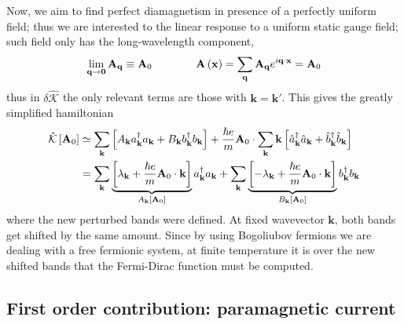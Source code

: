 Now, we aim to find perfect diamagnetism in presence of a perfectly uniform field; thus we are interested to the linear response to a uniform static gauge field; such field only has the long-wavelength component,
\[
	\lim_{\mathbf{q}\to\mathbf{0}} \mathbf{A}_\mathbf{q} \equiv \mathbf{A}_0
	\qquad\qquad
	\mathbf{A}\left({\mathbf{x}}\right) = \sum_\mathbf{q} \mathbf{A}_\mathbf{q} e^{i\mathbf{q}\cdot\mathbf{x}} = \mathbf{A}_0
\]
thus in $\delta \hat{\mathcal{K}}$ the only relevant terms are those with $\mathbf{k} = \mathbf{k}'$. This gives the greatly simplified hamiltonian
\begin{equation}\label{eq:first order perturbed paramagnetic hamiltonian}
\begin{aligned}
	\hat{\mathcal{K}} \left[{\mathbf{A}_0}\right] &\simeq \sum_\mathbf{k} \left[{A_\mathbf{k} a_\mathbf{k}^\dagger a_\mathbf{k} + B_\mathbf{k} b_\mathbf{k}^\dagger b_\mathbf{k}}\right] + \frac{\hbar e}{m} \mathbf{A}_0 \cdot \sum_\mathbf{k} \mathbf{k} \left[{\hat{a}_\mathbf{k}^\dagger \hat{a}_\mathbf{k} + \hat{b}_\mathbf{k}^\dagger \hat{b}_\mathbf{k} }\right] \\
	&= \sum_\mathbf{k} 
		\underbrace{\left[{\lambda_\mathbf{k} + \frac{\hbar e}{m} \mathbf{A}_0 \cdot \mathbf{k}}\right]}_{A_\mathbf{k} \left[{\mathbf{A}_0}\right]}
		 a_\mathbf{k}^\dagger a_\mathbf{k} + \sum_\mathbf{k} 
		 	\underbrace{\left[{- \lambda_\mathbf{k} + \frac{\hbar e}{m} \mathbf{A}_0 \cdot \mathbf{k}}\right]}_{B_\mathbf{k} \left[{\mathbf{A}_0}\right]}
		 b_\mathbf{k}^\dagger b_\mathbf{k}
\end{aligned}
\end{equation}
where the new perturbed bands were defined. At fixed wavevector $\mathbf{k}$, both bands get shifted by the same amount. Since by using Bogoliubov fermions we are dealing with a free fermionic system, at finite temperature it is over the new shifted bands that the Fermi-Dirac function must be computed.

\subsection{First order contribution: paramagnetic current}

